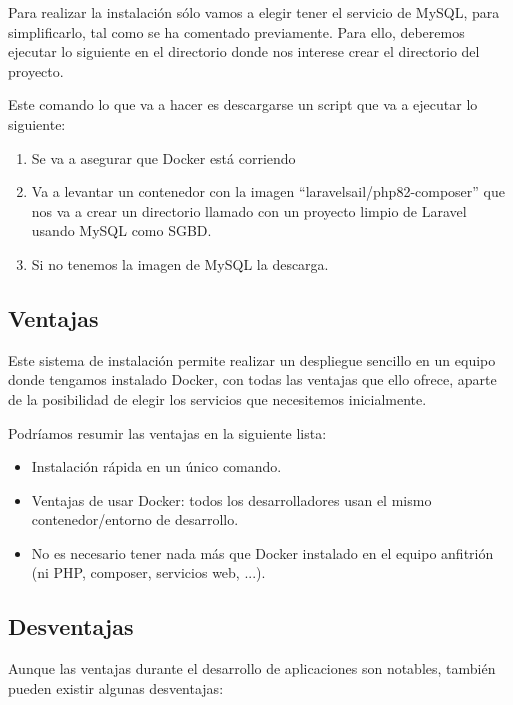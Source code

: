Para realizar la instalación sólo vamos a elegir tener el servicio de MySQL, para simplificarlo, tal como se ha comentado previamente. Para ello, deberemos ejecutar lo siguiente en el directorio donde nos interese crear el directorio del proyecto.


Este comando lo que va a hacer es descargarse un script que va a ejecutar lo siguiente:
\begin{enumerate}
    \item Se va a asegurar que Docker está corriendo
    \item Va a levantar un contenedor con la imagen “laravelsail/php82-composer” que nos va a crear un directorio llamado  con un proyecto limpio de Laravel usando MySQL como SGBD.
    \item Si no tenemos la imagen de MySQL la descarga.
\end{enumerate}


\subsection{Ventajas}

Este sistema de instalación permite realizar un despliegue sencillo en un equipo donde tengamos instalado Docker, con todas las ventajas que ello ofrece, aparte de la posibilidad de elegir los servicios que necesitemos inicialmente.

Podríamos resumir las ventajas en la siguiente lista:

\begin{itemize}
    \item Instalación rápida en un único comando.
    \item Ventajas de usar Docker: todos los desarrolladores usan el mismo contenedor/entorno de desarrollo.
    \item No es necesario tener nada más que Docker instalado en el equipo anfitrión (ni PHP, composer, servicios web, ...).
\end{itemize}

\subsection{Desventajas}
Aunque las ventajas durante el desarrollo de aplicaciones son notables, también pueden existir algunas desventajas:


